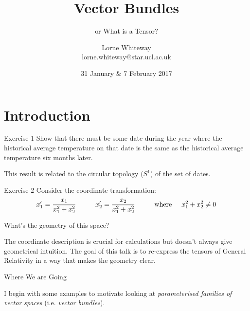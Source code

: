 \documentclass{beamer}
\title[Vector Bundles] %
{Vector Bundles}
\subtitle{or What is a Tensor?}
\author{Lorne Whiteway \\ lorne.whiteway@star.ucl.ac.uk}
\date{31 January \& 7 February 2017}
\begin{document}

\begin{frame}
  \titlepage
\end{frame}

\section{Introduction}

\begin{frame}{Exercise 1}
Show that there must be some date during the year where the historical average temperature on that date is the same as the historical average temperature six months later.

This result is related to the circular topology ($S^1$) of the set of dates.
\end{frame}

\begin{frame}{Exercise 2}
Consider the coordinate transformation:
\begin{equation*}
x'_1 = \frac{x_1}{x_1^2 + x_2^2} \hspace{1cm} x'_2 = \frac{x_2}{x_1^2 + x_2^2} \hspace{1cm} \text{where} \hspace{0.5cm} x_1^2 + x_2^2 \neq 0
\end{equation*}

What's the geometry of this space?

The coordinate description is crucial for calculations but doesn't always give geometrical intuition. The goal of this talk is to re-express the tensors of General Relativity in a way that makes the geometry clear.

\end{frame}

\begin{frame}{Where We are Going}

I begin with some examples to motivate looking at \textit{parameterised families of vector spaces} (i.e. \textit{vector bundles}).

\end{frame}
\end{document}

